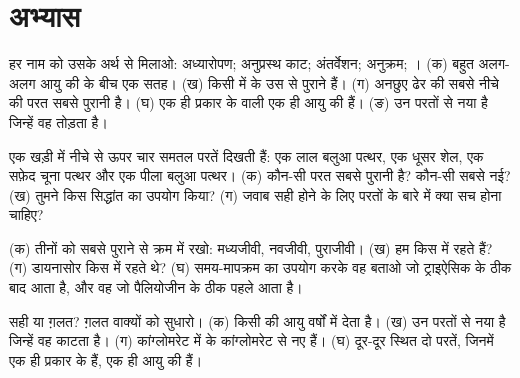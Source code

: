 \section{अभ्यास}

\begin{exercise}[$\star$]\label{exo:g7:geological-time:1}
हर नाम को उसके अर्थ से मिलाओ: अध्यारोपण; अनुप्रस्थ काट; अंतर्वेशन; 
अनुक्रम; । (क) बहुत अलग-अलग आयु की  के बीच एक  सतह।
(ख) किसी  में के  उस  से पुराने हैं। (ग) अनछुए ढेर की सबसे नीचे
की परत सबसे पुरानी है। (घ) एक ही प्रकार के  वाली  एक ही आयु की
हैं। (ङ)  उन परतों से नया है जिन्हें वह तोड़ता है।
\end{exercise}

\begin{exercise}[$\star$]\label{exo:g7:geological-time:2}
एक खड़ी  में नीचे से ऊपर चार समतल परतें दिखती हैं: एक लाल बलुआ पत्थर, एक
धूसर शेल, एक सफ़ेद चूना पत्थर और एक पीला बलुआ पत्थर। (क) कौन-सी परत सबसे
पुरानी है? कौन-सी सबसे नई? (ख) तुमने किस सिद्धांत का उपयोग किया? (ग) जवाब सही
होने के लिए परतों के बारे में क्या सच होना चाहिए?
\end{exercise}

\begin{exercise}[$\star$]\label{exo:g7:geological-time:3}
(क) तीनों  को सबसे पुराने से क्रम में रखो: मध्यजीवी, नवजीवी, पुराजीवी।
(ख) हम किस  में रहते हैं? (ग) डायनासोर किस  में रहते थे?
(घ) समय-मापक्रम का उपयोग करके वह  बताओ जो ट्राइऐसिक के ठीक बाद
आता है, और वह जो पैलियोजीन के ठीक पहले
आता है।
\end{exercise}

\begin{exercise}[$\star$]\label{exo:g7:geological-time:4}
सही या ग़लत? ग़लत वाक्यों को सुधारो। (क)  किसी  की
आयु वर्षों में देता है। (ख)  उन परतों से नया है जिन्हें वह काटता है।
(ग) कांग्लोमरेट में के  कांग्लोमरेट से नए हैं। (घ) दूर-दूर स्थित दो परतें,
जिनमें एक ही प्रकार के  हैं, एक ही आयु की
हैं।
\end{exercise}

